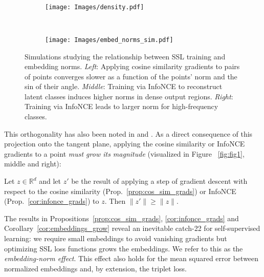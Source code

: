 \begin{figure*}
{\begin{subfigure}{0.27\linewidth}
\begin{tikzpicture}
    \end{tikzpicture}
    \caption{}
    \label{fig:convergence_sim}
    \end{subfigure}%
    }
    \,\,\,
    \begin{subfigure}{0.35\linewidth}
    \texttt{[image: Images/density.pdf]}
    \caption{}
    \label{fig:density}
    \end{subfigure}
    \,
    \begin{subfigure}{0.35\linewidth}
    \texttt{[image: Images/embed\_norms\_sim.pdf]}
    \caption{}
    \label{fig:class_imbalance}
    \end{subfigure}
    \caption{Simulations studying the relationship between SSL training and embedding norms. \emph{Left}: Applying cosine similarity gradients to pairs of points converges slower as a function of the points' norm and the sin of their angle. \emph{Middle}: Training via InfoNCE to reconstruct latent classes induces higher norms in dense output regions. \emph{Right}: Training via InfoNCE leads to larger norm for high-frequency classes.}
    \label{fig:confidence_sim}
\end{figure*}

This orthogonality has also been noted in \citet{normface} and \citet{mentions_catch22}. As a direct consequence of this projection onto the tangent plane, applying the cosine similarity or InfoNCE gradients to a point \emph{must grow its magnitude} (visualized in Figure%
~\ref{fig:fig1}, middle and right):
\begin{corollary}
    \label{cor:embeddings_grow}
    Let $z \in \mathbb{R}^d$ and let $z'$ be the result of applying a step of gradient descent with respect to the cosine similarity (Prop.~\ref{prop:cos_sim_grads}) or InfoNCE (Prop.~\ref{cor:infonce_grads}) to $z$. Then
    $\|z'\| \geq \|z\|$.
\end{corollary}

The results in Propositions~\ref{prop:cos_sim_grads}, \ref{cor:infonce_grads} and Corollary~\ref{cor:embeddings_grow} reveal an inevitable catch-22 for self-supervised learning: we require small embeddings to avoid vanishing gradients but optimizing SSL loss functions grows the embeddings. We refer to this as the \emph{embedding-norm effect}. This effect also holds for the mean squared error between normalized embeddings and, by extension, the triplet loss.

